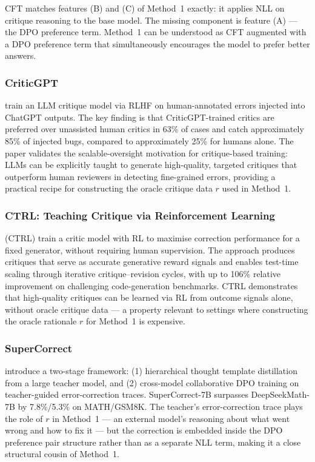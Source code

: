 CFT matches features (B) and (C) of Method~1 exactly: it applies NLL on critique reasoning to the base model. The missing component is feature (A) --- the DPO preference term. Method~1 can be understood as CFT augmented with a DPO preference term that simultaneously encourages the model to prefer better answers.

\subsubsection{CriticGPT}

\autocite{mcaleese2024llmcriticshelpllm} train an LLM critique model via RLHF on human-annotated errors injected into ChatGPT outputs. The key finding is that CriticGPT-trained critics are preferred over unassisted human critics in 63\% of cases and catch approximately 85\% of injected bugs, compared to approximately 25\% for humans alone. The paper validates the scalable-oversight motivation for critique-based training: LLMs can be explicitly taught to generate high-quality, targeted critiques that outperform human reviewers in detecting fine-grained errors, providing a practical recipe for constructing the oracle critique data $r$ used in Method~1.

\subsubsection{CTRL: Teaching Critique via Reinforcement Learning}

\autocite{xie2025teachinglanguagemodelscritique} (CTRL) train a critic model with RL to maximise correction performance for a fixed generator, without requiring human supervision. The approach produces critiques that serve as accurate generative reward signals and enables test-time scaling through iterative critique--revision cycles, with up to 106\% relative improvement on challenging code-generation benchmarks. CTRL demonstrates that high-quality critiques can be learned via RL from outcome signals alone, without oracle critique data --- a property relevant to settings where constructing the oracle rationale $r$ for Method~1 is expensive.

\subsubsection{SuperCorrect}

\autocite{yang2024supercorrect} introduce a two-stage framework: (1) hierarchical thought template distillation from a large teacher model, and (2) cross-model collaborative DPO training on teacher-guided error-correction traces. SuperCorrect-7B surpasses DeepSeekMath-7B by 7.8\%/5.3\% on MATH/GSM8K. The teacher's error-correction trace plays the role of $r$ in Method~1 --- an external model's reasoning about what went wrong and how to fix it --- but the correction is embedded inside the DPO preference pair structure rather than as a separate NLL term, making it a close structural cousin of Method~1.

